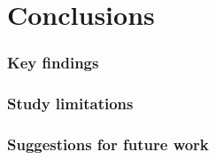 \section{Conclusions}


\begin{frame}
    \frametitle{Key findings}
    \vspace{3mm}



    \vfill 
\end{frame}


\begin{frame}
    \frametitle{Study limitations}
    \vspace{3mm}



    \vfill 
\end{frame}


\begin{frame}
    \frametitle{Suggestions for future work}
    \vspace{3mm}



    \vfill 
\end{frame}